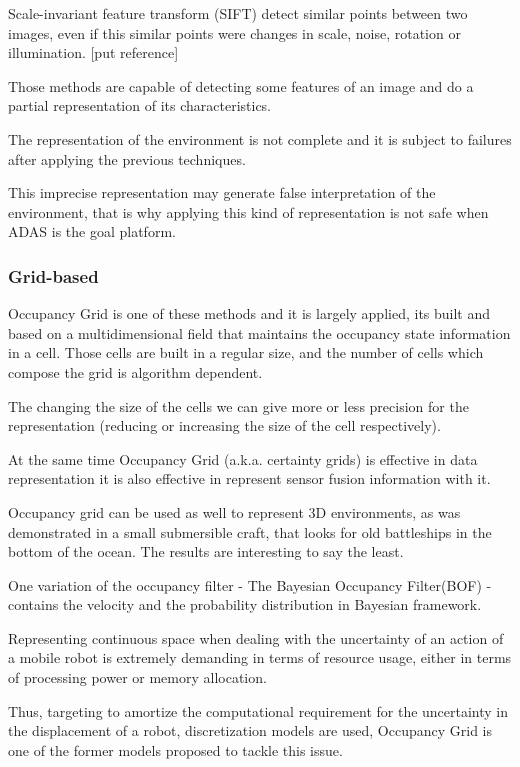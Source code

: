 Scale-invariant feature transform (SIFT) detect similar points between two images, even if this similar points were changes in scale, noise, rotation or illumination. [put reference] 

Those methods are capable of detecting some features of an image and do a partial representation of its characteristics. 

The representation of the environment is not complete and it is subject to failures after applying the previous techniques.

This imprecise representation may generate false interpretation of the environment, that is why applying this kind of representation is not safe when ADAS is the goal platform.

\subsubsection{Grid-based}

Occupancy Grid is one of these methods and it is largely applied, its built and based on a multidimensional field that maintains the occupancy state information in a cell\cite{Elfes:1989:UOG:68491.68495}. Those cells are built in a regular size, and the number of cells which compose the grid is algorithm dependent.

The changing the size of the cells we can give more or less precision for the representation (reducing or increasing the size of the cell respectively).

At the same time Occupancy Grid (a.k.a. certainty grids) is effective in data representation it is also effective in represent sensor fusion information with it. 

Occupancy grid can be used as well to represent 3D environments, as was demonstrated in a small submersible craft, that looks for old battleships in the bottom of the ocean\cite{DBLP:journals/aim/Moravec88}. The results are interesting to say the least.

One variation of the occupancy filter - The Bayesian Occupancy Filter(BOF) - contains the velocity and the probability distribution in Bayesian framework.

Representing continuous space when dealing with the uncertainty of an action of a mobile robot is extremely demanding in terms of resource usage, either in terms of processing power or memory allocation.

Thus, targeting to amortize the computational requirement for the uncertainty in the displacement of a robot, discretization models are used, Occupancy Grid\cite{Elfes:1989:UOG:68491.68495} is one of the former models proposed to tackle this issue.

